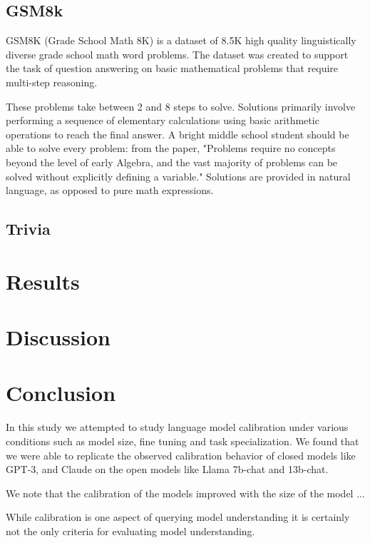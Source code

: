\documentclass[11pt]{article}
\begin{document}
\subsection{GSM8k}

GSM8K (Grade School Math 8K) is a dataset of 8.5K high quality linguistically diverse grade school math word problems. The dataset was created to support the task of question answering on basic mathematical problems that require multi-step reasoning.

These problems take between 2 and 8 steps to solve. Solutions primarily involve performing a sequence of elementary calculations using basic arithmetic operations  to reach the final answer. A bright middle school student should be able to solve every problem: from the paper, "Problems require no concepts beyond the level of early Algebra, and the vast majority of problems can be solved without explicitly defining a variable." Solutions are provided in natural language, as opposed to pure math expressions. 

\subsection{Trivia}


\section{Results}

\section{Discussion}

\section{Conclusion}

In this study we attempted to study language model calibration 
under various conditions such as model size, fine tuning and  
task specialization. We found that we were able to replicate the 
observed  calibration behavior of closed models like GPT-3, and 
Claude on the open models like Llama 7b-chat and 13b-chat. 

We note that the calibration of the models  improved with the size 
of the model ...

While calibration is one aspect of querying model understanding it is 
certainly  not the only criteria for evaluating model understanding.  
\end{document}
